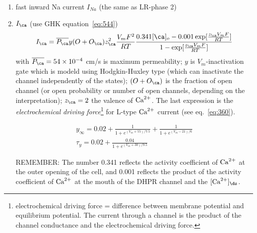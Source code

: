 \begin{enumerate}
\item fast inward Na current $I_{Na}$ (the same as LR-phase 2)
\item $I_\ca $ (use GHK equation~\eqref{eq:544})
  \begin{equation}
    \label{eq:779}
    I_\ca  = \overline{P_\ca } y (O + O_\ca )z^2_\ca \frac{V_mF^2}{RT}
    \frac{0.341[\ca]_o - 0.001\exp[\frac{z_\ca V_mF}{RT}]}{ 1-
      \exp[\frac{z_\ca V_mF}{RT}]}
  \end{equation}
  with $\overline{P_\ca }=54\times 10^{-4}$ cm/s is maximum
  permeability; $y$ is $V_m$-inactivation gate which is modeld using
  Hodgkin-Huxley type (which can inactivate the channel independently of the
  states); $(O+O_\ca) $ is the fraction of open channel (or open probability or
  number of open channels, depending on the interpretation); $z_\ca =2$ the valence of ${\text{Ca}^{2+}}$. The last expression is the
  {\it electrochemical driving
    force}\footnote{electrochemical driving force = difference
    between membrane potential and equilibrium potential. The current
    through a channel is the product of the channel conductance and
    the electrochemical driving force.}
  for L-type ${\text{Ca}^{2+}}$ current (see eq.~\eqref{eq:360}).
  
  \begin{equation}
  \begin{split}
  y_\infty = 0.02 + \frac{1}{1+ e^{(V_m+55)/7.5}} + \frac{1}{1+e^{(V_m-21)/6}}
  \\
  \tau_y = 0.02 + \frac{0.04}{1 + e^{(V_m+30)/9.5}}
  \end{split}
  \end{equation}
  
  \begin{framed}
  REMEMBER:  The number 0.341 reflects the activity coefficient of ${\text{Ca}^{2+}}$ at the
    outer opening of the cell, and 0.001 reflects the product of the
    activity coefficient of ${\text{Ca}^{2+}}$ at the mouth of the DHPR channel and
    the $[\Ca]_\ds$. 
  \end{framed}


\end{enumerate}
